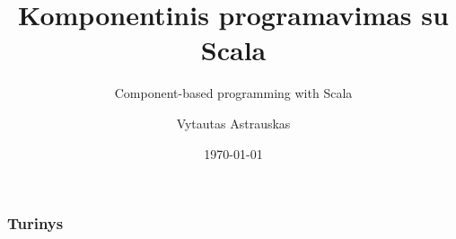 \documentclass[]{beamer}
\title{Komponentinis programavimas su Scala}
\subtitle{Component-based programming with Scala}
\author{Vytautas Astrauskas}
\institute{
Vilniaus universitetas\\
Matematikos ir informatikos fakultetas\\
Programų sistemų katedra%
}
\date{\today}
\begin{document}
  \frame{\titlepage}

  \begin{frame}
  \frametitle{Turinys}
  \tableofcontents[hideallsubsections]
  \end{frame}

  
\end{document}
